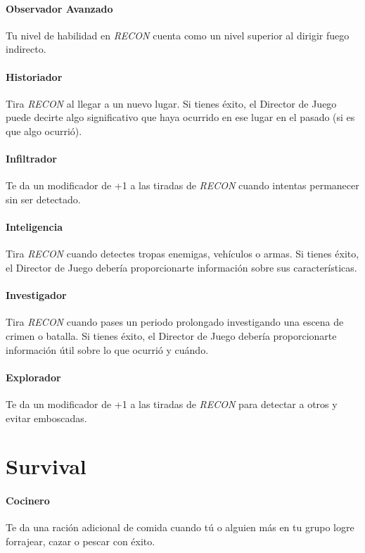     \paragraph{Observador Avanzado}  
    Tu nivel de habilidad en \emph{RECON} cuenta como un nivel superior al dirigir fuego indirecto.  

    \paragraph{Historiador}  
    Tira \emph{RECON} al llegar a un nuevo lugar. Si tienes éxito, el Director de Juego puede decirte algo significativo que haya ocurrido en ese lugar en el pasado (si es que algo ocurrió).  

    \paragraph{Infiltrador}  
    Te da un modificador de +1 a las tiradas de \emph{RECON} cuando intentas permanecer sin ser detectado.  

    \paragraph{Inteligencia}  
    Tira \emph{RECON} cuando detectes tropas enemigas, vehículos o armas. Si tienes éxito, el Director de Juego debería proporcionarte información sobre sus características.  

    \paragraph{Investigador}  
    Tira \emph{RECON} cuando pases un periodo prolongado investigando una escena de crimen o batalla. Si tienes éxito, el Director de Juego debería proporcionarte información útil sobre lo que ocurrió y cuándo.  

    \paragraph{Explorador}  
    Te da un modificador de +1 a las tiradas de \emph{RECON} para detectar a otros y evitar emboscadas.

\section{Survival}

    \paragraph{Cocinero}  
    Te da una ración adicional de comida cuando tú o alguien más en tu grupo logre forrajear, cazar o pescar con éxito.  

